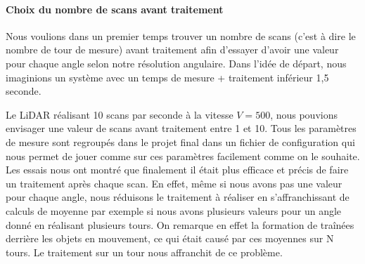 \paragraph{Choix du nombre de scans avant traitement}
\tab Nous voulions dans un premier temps trouver un nombre de scans (c'est à dire le nombre de tour de mesure) avant traitement afin d'essayer d'avoir une valeur pour chaque angle selon notre résolution angulaire. Dans l'idée de départ, nous imaginions un système avec un temps de mesure + traitement inférieur 1,5 seconde.

\tab Le LiDAR réalisant 10 scans par seconde à la vitesse $V = 500 $, nous pouvions envisager une valeur de scans avant traitement entre 1 et 10. Tous les paramètres de mesure sont regroupés dans le projet final dans un fichier de configuration qui nous permet de jouer comme sur ces paramètres facilement comme on le souhaite. Les essais nous ont montré que finalement il était plus efficace et précis de faire un traitement après chaque scan. En effet, même si nous avons pas une valeur pour chaque angle, nous réduisons le traitement à réaliser en s'affranchissant de calculs de moyenne par exemple si nous avons plusieurs valeurs pour un angle donné en réalisant plusieurs tours. On remarque en effet la formation de traînées derrière les objets en mouvement, ce qui était causé par ces moyennes sur N tours. Le traitement sur un tour nous affranchit de ce problème.